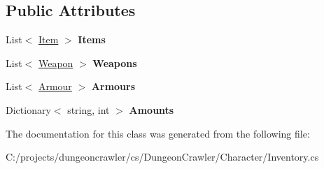 \subsection*{Public Attributes}
\begin{DoxyCompactItemize}
\item 
\hypertarget{class_dungeon_crawler_1_1_character_1_1_inventory_a470eb7828ae32ab8702a671d41812bb1}{}List$<$ \hyperlink{class_dungeon_crawler_1_1_core_1_1_item}{Item} $>$ {\bfseries Items}\label{class_dungeon_crawler_1_1_character_1_1_inventory_a470eb7828ae32ab8702a671d41812bb1}

\item 
\hypertarget{class_dungeon_crawler_1_1_character_1_1_inventory_ac1ce6fd154f4dcf2fdefd89db2a1f28e}{}List$<$ \hyperlink{class_dungeon_crawler_1_1_core_1_1_weapon}{Weapon} $>$ {\bfseries Weapons}\label{class_dungeon_crawler_1_1_character_1_1_inventory_ac1ce6fd154f4dcf2fdefd89db2a1f28e}

\item 
\hypertarget{class_dungeon_crawler_1_1_character_1_1_inventory_a61b8d31b7b04ae4fe1d0f6adb4cdfcaf}{}List$<$ \hyperlink{class_dungeon_crawler_1_1_core_1_1_armour}{Armour} $>$ {\bfseries Armours}\label{class_dungeon_crawler_1_1_character_1_1_inventory_a61b8d31b7b04ae4fe1d0f6adb4cdfcaf}

\item 
\hypertarget{class_dungeon_crawler_1_1_character_1_1_inventory_a1c1ead94848b857ac163c6e820370d5f}{}Dictionary$<$ string, int $>$ {\bfseries Amounts}\label{class_dungeon_crawler_1_1_character_1_1_inventory_a1c1ead94848b857ac163c6e820370d5f}

\end{DoxyCompactItemize}


The documentation for this class was generated from the following file\+:\begin{DoxyCompactItemize}
\item 
C\+:/projects/dungeoncrawler/cs/\+Dungeon\+Crawler/\+Character/Inventory.\+cs\end{DoxyCompactItemize}
